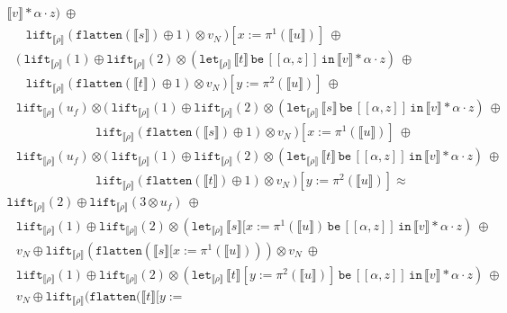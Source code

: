 \documentclass[a4paper,UKenglish,cleveref,autoref,numberwithinsect]{lipics-v2019}
\theoremstyle{definition}
\newcommand{\expair}[2]{[#1,#2]}
\newcommand{\flatten}{\mathtt{flatten}}
\newcommand{\lift}{\mathtt{lift}}
\newcommand{\typeinterpret}[1]{\llbracket #1 \rrbracket}
\newcommand{\interpret}[1]{\llbracket #1 \rrbracket}
\newcommand{\xlet}[4]{\mathtt{let}_{#1}\,#2\,\mathtt{be}\,[#3]\,\mathtt{in}\,#4}
\begin{document}
\begin{itemize}
\[\begin{array}{l}
{      \interpret{v} * \alpha \cdot z})\ \oplus \\
  \phantom{AB}
    \lift_{\typeinterpret{\rho}}(\flatten(\interpret{s}) \oplus 1)
    \otimes v_N\ )[x:=\pi^1(\interpret{u})]\ \oplus \\
  \phantom{A}
  (\ \lift_{\typeinterpret{\rho}}(1) \oplus
    \lift_{\typeinterpret{\rho}}(2) \otimes
    (\xlet{\typeinterpret{\rho}}{\interpret{t}}{\expair{\alpha}{z}}{
      \interpret{v} * \alpha \cdot z})\ \oplus \\
  \phantom{AB}
    \lift_{\typeinterpret{\rho}}(\flatten(\interpret{t}) \oplus 1)
    \otimes v_N\ )[y:=\pi^2(\interpret{u})]\ \oplus \\
  \phantom{A}
  \lift_{\typeinterpret{\rho}}(u_f) \otimes
  (\ \lift_{\typeinterpret{\rho}}(1) \oplus
    \lift_{\typeinterpret{\rho}}(2) \otimes
    (\xlet{\typeinterpret{\rho}}{\interpret{s}}{\expair{\alpha}{z}}{
      \interpret{v} * \alpha \cdot z})\ \oplus \\
  \phantom{ABCDEFGHIJ}
    \lift_{\typeinterpret{\rho}}(\flatten(\interpret{s}) \oplus 1)
    \otimes v_N\ )[x:=\pi^1(\interpret{u})]\ \oplus \\
  \phantom{A}
  \lift_{\typeinterpret{\rho}}(u_f) \otimes
  (\ \lift_{\typeinterpret{\rho}}(1) \oplus
    \lift_{\typeinterpret{\rho}}(2) \otimes
    (\xlet{\typeinterpret{\rho}}{\interpret{t}}{\expair{\alpha}{z}}{
      \interpret{v} * \alpha \cdot z})\ \oplus \\
  \phantom{ABCDEFGHIJ}
    \lift_{\typeinterpret{\rho}}(\flatten(\interpret{t}) \oplus 1)
    \otimes v_N\ )[y:=\pi^2(\interpret{u})] \approx \\
  \lift_{\typeinterpret{\rho}}(2) \oplus
  \lift_{\typeinterpret{\rho}}(3 \otimes u_f)\ \oplus \\
  \phantom{A}
  \lift_{\typeinterpret{\rho}}(1) \oplus
  \lift_{\typeinterpret{\rho}}(2) \otimes
  (\xlet{\typeinterpret{\rho}}{\interpret{s}[x:=\pi^1(\interpret{u})}{
    \expair{\alpha}{z}}{\interpret{v} * \alpha \cdot z})\ \oplus \\
  \phantom{A}
  v_N \oplus \lift_{\typeinterpret{\rho}}(\flatten(\interpret{s}[x:=
    \pi^1(\interpret{u}))) \otimes v_N\ \oplus \\
  \phantom{A}
  \lift_{\typeinterpret{\rho}}(1) \oplus
    \lift_{\typeinterpret{\rho}}(2) \otimes
    (\xlet{\typeinterpret{\rho}}{\interpret{t}[y:=\pi^2(\interpret{u})]}{
    \expair{\alpha}{z}}{\interpret{v} * \alpha \cdot z})\ \oplus \\
  \phantom{A}
  v_N \oplus \lift_{\typeinterpret{\rho}}(\flatten(\interpret{t}[y:=

\end{array}\]
\end{itemize}
\end{document}
